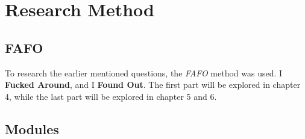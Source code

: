 \chapter{Research Method}

\section{FAFO}

To research the earlier mentioned questions, the \textit{FAFO} method was used.
I \textbf{Fucked Around}, and I \textbf{Found Out}. The first part will be explored in chapter 4,
while the last part will be explored in chapter 5 and 6.


\section{Modules}
